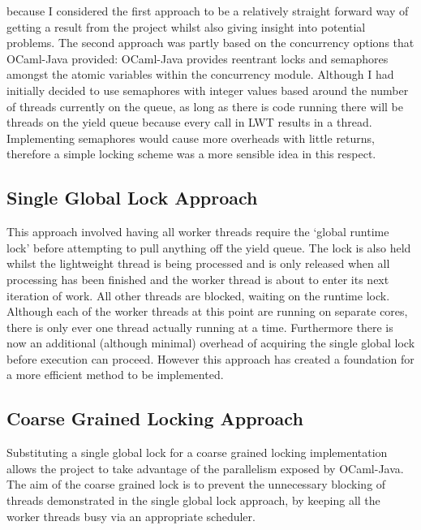 \documentclass[12pt,twoside,notitlepage]{report}
\begin{document}
because I considered the first approach to be a relatively straight forward way of getting a result from the project whilst also giving insight into potential problems. The second approach was partly based on the concurrency options
that OCaml-Java provided: OCaml-Java provides reentrant locks and semaphores amongst the atomic variables within the concurrency module. Although I had initially decided to use semaphores with integer values based around the
number of threads currently on the queue, as long as there is code running there will be threads on the yield queue because every call in LWT results in a thread. Implementing semaphores would cause more overheads with little
returns, therefore a simple locking scheme was a more sensible idea in this respect.

\subsection{Single Global Lock Approach}
\label{subsec:naive_runtime_lock_apprach}
%
%
This approach involved having all worker threads require the `global runtime lock' before attempting to pull anything off the yield queue. The lock is also held whilst the lightweight thread is being processed and is only released when all
processing has been finished and the worker thread is about to enter its next iteration of work. All other threads are blocked, waiting on the runtime lock. Although each of the worker threads at this point are running on separate
cores, there is only ever one thread actually running at a time. Furthermore there is now an additional (although minimal) overhead of acquiring the single global lock before execution can proceed. However this approach has created a
foundation for a more efficient method to be implemented.
%
%
\subsection{Coarse Grained Locking Approach}
\label{subsec:coarse_grained_locking_apprach}
%
%
Substituting a single global lock for a coarse grained locking implementation allows the project to take advantage of the parallelism exposed by OCaml-Java. The aim of the coarse grained lock is
to prevent the unnecessary blocking of threads demonstrated in the single global lock approach, by keeping all the worker threads busy via an appropriate scheduler.
\end{document}
